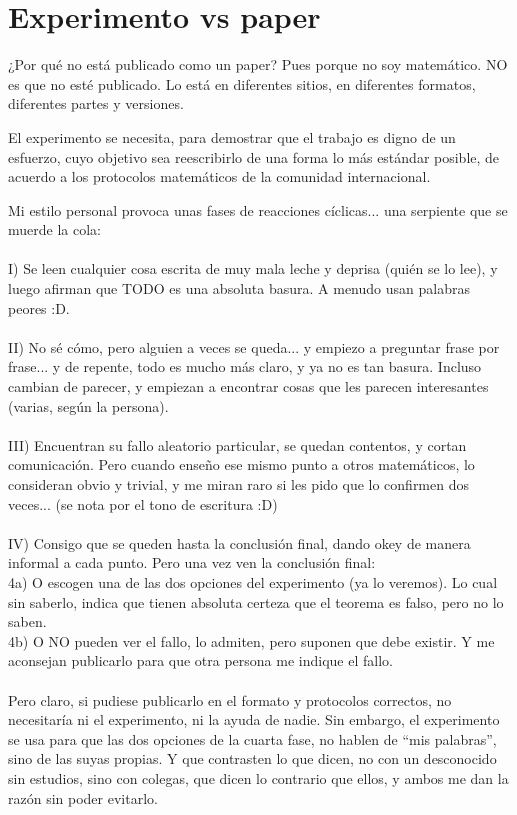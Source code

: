 \chapter{Experimento vs paper}

\noindent
¿Por qué no está publicado como un paper? Pues porque no soy matemático. NO es que no esté publicado. Lo está en diferentes sitios, en diferentes formatos, diferentes partes y versiones.

\noindent
El experimento se necesita, para demostrar que el trabajo es digno de un esfuerzo, cuyo objetivo sea reescribirlo de una forma lo más estándar posible, de acuerdo a los protocolos matemáticos de la comunidad internacional.

\noindent
Mi estilo personal provoca unas fases de reacciones cíclicas... una serpiente que se muerde la cola:\\\\
I) Se leen cualquier cosa escrita de muy mala leche y deprisa (quién se lo lee), y luego afirman que TODO es una absoluta basura. A menudo usan palabras peores :D.\\\\
II) No sé cómo, pero alguien a veces se queda... y empiezo a preguntar frase por frase... y de repente, todo es mucho más claro, y ya no es tan basura. Incluso cambian de parecer, y empiezan a encontrar cosas que les parecen interesantes (varias, según la persona).\\\\
III) Encuentran su fallo aleatorio particular, se quedan contentos, y cortan comunicación. Pero cuando enseño ese mismo punto a otros matemáticos, lo consideran obvio y trivial, y me miran raro si les pido que lo confirmen dos veces... (se nota por el tono de escritura :D)\\\\
IV) Consigo que se queden hasta la conclusión final, dando okey de manera informal a cada punto. Pero una vez ven la conclusión final:\\
4a) O escogen una de las dos opciones del experimento (ya lo veremos). Lo cual sin saberlo, indica que tienen absoluta certeza que el teorema es falso, pero no lo saben.\\
4b) O NO pueden ver el fallo, lo admiten, pero suponen que debe existir. Y me aconsejan publicarlo para que otra persona me indique el fallo.\\\\

\noindent
Pero claro, si pudiese publicarlo en el formato y protocolos correctos, no necesitaría ni el experimento, ni la ayuda de nadie. Sin embargo, el experimento se usa para que las dos opciones de la cuarta fase, no hablen de ``mis palabras'', sino de las suyas propias. Y que contrasten lo que dicen, no con un desconocido sin estudios, sino con colegas, que dicen lo contrario que ellos, y ambos me dan la razón sin poder evitarlo.

